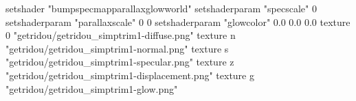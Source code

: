 setshader "bumpspecmapparallaxglowworld"
setshaderparam "specscale" 0
setshaderparam "parallaxscale" 0 0
setshaderparam "glowcolor" 0.0 0.0 0.0
texture 0 "getridou/getridou_simptrim1-diffuse.png"
texture n "getridou/getridou_simptrim1-normal.png"
texture s "getridou/getridou_simptrim1-specular.png"
texture z "getridou/getridou_simptrim1-displacement.png"
texture g "getridou/getridou_simptrim1-glow.png"
